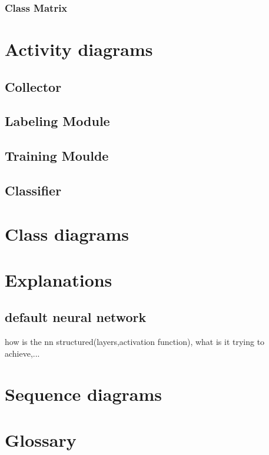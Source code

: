 \documentclass[parskip=full]{scrartcl}
\begin{document}
\subsubsection{Class Matrix}


\section{Activity diagrams}


\subsection{Collector}
\subsection{Labeling Module}
\subsection{Training Moulde}

\subsection{Classifier}

\section{Class diagrams}

\section{Explanations}
\subsection{default neural network}
how is the nn structured(layers,activation function), what is it trying to achieve,...


\section{Sequence diagrams}

\section{Glossary}

%
\printnoidxglossaries
\end{document}
